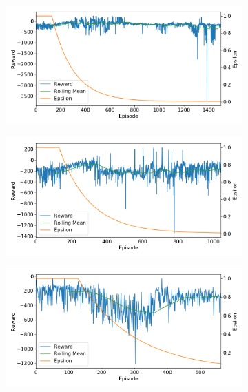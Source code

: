 \documentclass[10pt]{article}
\begin{document}
\begin{figure}[H]
  \centering
  \begin{subfigure}[b]{0.49\linewidth}
  \centering
  \includegraphics[width=\linewidth]{../logs/train_param_0077.png}
      \caption{}
  \label{fig:train_param_0077}
  \end{subfigure}
  \begin{subfigure}[b]{0.49\linewidth}
  \centering
  \includegraphics[width=\linewidth]{../logs/train_param_0079.png}
      \caption{}
  \label{fig:train_param_0079}
  \end{subfigure}
  \begin{subfigure}[b]{0.49\linewidth}
  \centering
  \includegraphics[width=\linewidth]{../logs/train_param_0083.png}

\end{subfigure}
\end{figure}
\end{document}

